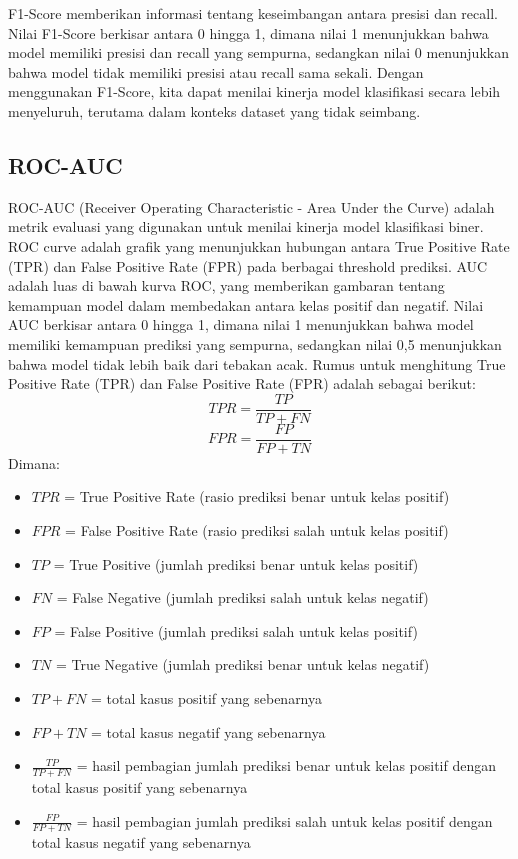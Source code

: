 F1-Score memberikan informasi tentang keseimbangan antara presisi dan recall. Nilai F1-Score berkisar antara 0 hingga 1, dimana nilai 1 menunjukkan bahwa model memiliki presisi dan recall yang sempurna, sedangkan nilai 0 menunjukkan bahwa model tidak memiliki presisi atau recall sama sekali. Dengan menggunakan F1-Score, kita dapat menilai kinerja model klasifikasi secara lebih menyeluruh, terutama dalam konteks dataset yang tidak seimbang.

\subsection{ROC-AUC}
ROC-AUC (Receiver Operating Characteristic - Area Under the Curve) adalah metrik evaluasi yang digunakan untuk menilai kinerja model klasifikasi biner. ROC curve adalah grafik yang menunjukkan hubungan antara True Positive Rate (TPR) dan False Positive Rate (FPR) pada berbagai threshold prediksi. AUC adalah luas di bawah kurva ROC, yang memberikan gambaran tentang kemampuan model dalam membedakan antara kelas positif dan negatif. Nilai AUC berkisar antara 0 hingga 1, dimana nilai 1 menunjukkan bahwa model memiliki kemampuan prediksi yang sempurna, sedangkan nilai 0,5 menunjukkan bahwa model tidak lebih baik dari tebakan acak. \parencite{fawcett2006introduction}
Rumus untuk menghitung True Positive Rate (TPR) dan False Positive Rate (FPR) adalah sebagai berikut:
\begin{equation}
    TPR = \frac{TP}{TP + FN}
\end{equation}
\begin{equation}
    FPR = \frac{FP}{FP + TN}
\end{equation}
Dimana:
\begin{itemize}
    \item $TPR$ = True Positive Rate (rasio prediksi benar untuk kelas positif)
    \item $FPR$ = False Positive Rate (rasio prediksi salah untuk kelas positif)
    \item $TP$ = True Positive (jumlah prediksi benar untuk kelas positif)
    \item $FN$ = False Negative (jumlah prediksi salah untuk kelas negatif)
    \item $FP$ = False Positive (jumlah prediksi salah untuk kelas positif)
    \item $TN$ = True Negative (jumlah prediksi benar untuk kelas negatif)
    \item $TP + FN$ = total kasus positif yang sebenarnya
    \item $FP + TN$ = total kasus negatif yang sebenarnya
    \item $\frac{TP}{TP + FN}$ = hasil pembagian jumlah prediksi benar untuk kelas positif dengan total kasus positif yang sebenarnya
    \item $\frac{FP}{FP + TN}$ = hasil pembagian jumlah prediksi salah untuk kelas positif dengan total kasus negatif yang sebenarnya
\end{itemize}

